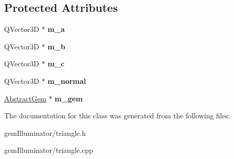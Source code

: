 \subsection*{Protected Attributes}
\begin{DoxyCompactItemize}
\item 
\hypertarget{class_triangle_a38f859bd8a6291d1fe460dbcf3c937c8}{}Q\+Vector3\+D $\ast$ {\bfseries m\+\_\+a}\label{class_triangle_a38f859bd8a6291d1fe460dbcf3c937c8}

\item 
\hypertarget{class_triangle_a783a7fcacbfa566c37dfd3fa8c6f44fd}{}Q\+Vector3\+D $\ast$ {\bfseries m\+\_\+b}\label{class_triangle_a783a7fcacbfa566c37dfd3fa8c6f44fd}

\item 
\hypertarget{class_triangle_ae39dcbf0b28b543900380517bbef628c}{}Q\+Vector3\+D $\ast$ {\bfseries m\+\_\+c}\label{class_triangle_ae39dcbf0b28b543900380517bbef628c}

\item 
\hypertarget{class_triangle_a86922a6a07e847f2df3b9310af273d8a}{}Q\+Vector3\+D $\ast$ {\bfseries m\+\_\+normal}\label{class_triangle_a86922a6a07e847f2df3b9310af273d8a}

\item 
\hypertarget{class_triangle_a205c63aa77abccf049d3535cb2512df0}{}\hyperlink{class_abstract_gem}{Abstract\+Gem} $\ast$ {\bfseries m\+\_\+gem}\label{class_triangle_a205c63aa77abccf049d3535cb2512df0}

\end{DoxyCompactItemize}


The documentation for this class was generated from the following files\+:\begin{DoxyCompactItemize}
\item 
gem\+Illuminator/triangle.\+h\item 
gem\+Illuminator/triangle.\+cpp\end{DoxyCompactItemize}
